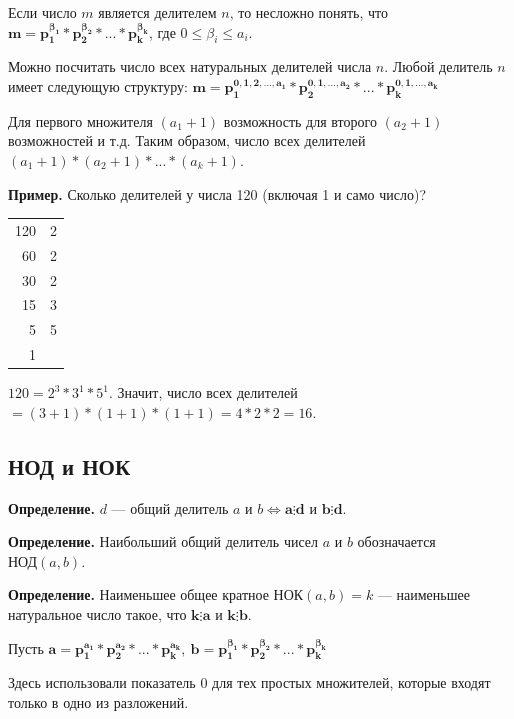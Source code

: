 \documentclass{article}
\begin{document}
            Если число \( m \) является делителем \( n \), то несложно понять, что \( \mathbf{m = p_1^{\beta_1}*p_2^{\beta_2}*...*p_k^{\beta_k}} \), где \( 0 \leq \beta_i \leq a_i \).

            Можно посчитать число всех натуральных делителей числа \( n \). Любой делитель \( n \) имеет следующую структуру: \( \mathbf{m = p_1^{0,1,2,...,a_1}*p_2^{0,1,...,a_2}*...*p_k^{0,1,...,a_k}} \)

            Для первого множителя \( (a_1 + 1) \) возможность для второго \( (a_2 + 1) \) возможностей и т.д. Таким образом, число всех делителей \( (a_1 + 1)*(a_2 + 1)*...*(a_k + 1) \).

            \textbf{Пример.} Сколько делителей у числа 120 (включая 1 и само число)?

            \begin{tabular}{r|l}
              120 & 2\\
              60 & 2\\
              30 & 2\\
              15 & 3\\
              5 & 5\\
              1 & \\
            \end{tabular}

            \( 120 = 2^3 * 3^1 * 5^1 \). Значит, число всех делителей \( = (3 + 1)*(1 + 1)*(1 + 1) = 4*2*2 = 16 \).

        \subsection{НОД и НОК}
            \textbf{Определение.} \( d \) --- общий делитель \( a \) и \( b \Leftrightarrow \mathbf{a \vdots d } \) и \( \mathbf{b \vdots d} \).

            \textbf{Определение.} Наибольший общий делитель чисел \( a \) и \( b \) обозначается \( \textrm{НОД}(a, b) \).

            \textbf{Определение.} Наименьшее общее кратное \( \textrm{НОК}(a, b) = k \) --- наименьшее натуральное число такое, что \( \mathbf{k \vdots a} \) и \( \mathbf{k \vdots b} \).

            Пусть \( \mathbf{a = p_1^{a_1} * p_2^{a_2} * ... * p_k^{a_k}},\ \mathbf{b = p_1^{\beta_1} * p_2^{\beta_2} * ... * p_k^{\beta_k}} \)

            Здесь использовали показатель 0 для тех простых множителей, которые входят только в одно из разложений.
\end{document}
